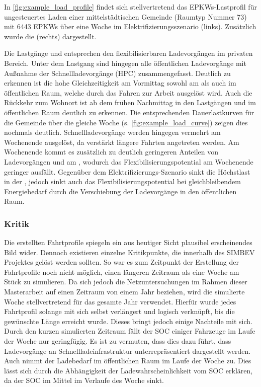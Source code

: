 

In \autoref{fig:example_load_profile} findet sich stellvertretend das \glspl{EPKW}-Lastprofil für ungesteuertes Laden einer mittelstädtischen Gemeinde (Raumtyp Nummer \num{73}) mit \num{6443} \glspl{EPKW} über eine Woche im Elektrifizierungsszenario (links).
Zusätzlich wurde die \SzeFirmenparkplatz (rechts) dargestellt.



Die Lastgänge \zH und \Firmeparkplatz entsprechen den flexibilisierbaren Ladevorgängen im privaten Bereich. Unter dem Lastgang \oeffen sind hingegen alle öffentlichen Ladevorgänge mit Außnahme der Schnellladevorgänge (\gls{HPC}) zusammengefasst. Deutlich zu erkennen ist die hohe Gleichzeitigkeit am Vormittag sowohl am \Firmeparkplatz als auch im öffentlichen Raum, welche durch das Fahren zur Arbeit ausgelöst wird.
Auch die Rückkehr zum Wohnort ist ab dem frühen Nachmittag in den Lastgängen \zH und im öffentlichen Raum deutlich zu erkennen. Die entsprechenden Dauerlastkurven für die Gemeinde über die gleiche Woche (s. \autoref{fig:example_load_curve}) zeigen dies nochmals deutlich.
Schnellladevorgänge werden hingegen vermehrt am Wochenende ausgelöst, da verstärkt längere Fahrten angetreten werden.
Am Wochenende kommt es zusätzlich zu deutlich geringeren Anteilen von Ladevorgängen \zH und am \Firmeparkplatzdot, wodurch das Flexibilisierungspotential am Wochenende geringer ausfällt.
Gegenüber dem Elektrifizierungs-Szenario sinkt die Höchstlast in der \SzeFirmenparkplatzdot, jedoch sinkt auch das Flexibilisierungspotential bei gleichbleibendem Energiebedarf durch die Verschiebung der Ladevorgänge in den öffentlichen Raum.




\subsubsection{Kritik}

Die erstellten Fahrtprofile spiegeln ein aus heutiger Sicht plausibel erscheinendes Bild wider.
Dennoch existieren einzelne Kritikpunkte, die innerhalb des \gls{SIMBEV} Projektes gelöst werden sollten.
So war es zum Zeitpunkt der Erstellung der Fahrtprofile noch nicht möglich, einen längeren Zeitraum als eine Woche am Stück zu simulieren.
Da sich jedoch die Netzuntersuchungen im Rahmen dieser Masterarbeit auf einen Zeitraum von einem Jahr beziehen, wird die simulierte Woche stellvertretend für das gesamte Jahr verwendet.
Hierfür wurde jedes Fahrtprofil solange mit sich selbst verlängert und logisch verknüpft, bis die gewünschte Länge erreicht wurde.
Dieses bringt jedoch einige Nachteile mit sich.
Durch den kurzen simulierten Zeitraum fällt der \gls{SOC} einiger Fahrzeuge im Laufe der Woche nur geringfügig.
Es ist zu vermuten, dass dies dazu führt, dass Ladevorgänge an Schnellladeinfrastruktur un­ter­re­prä­sen­tiert dargestellt werden.
Auch nimmt der Ladebedarf im öffentlichen Raum im Laufe der Woche zu.
Dies lässt sich durch die Abhängigkeit der Ladewahrscheinlichkeit vom \gls{SOC} erklären, da der \gls{SOC} im Mittel im Verlaufe des Woche sinkt.


